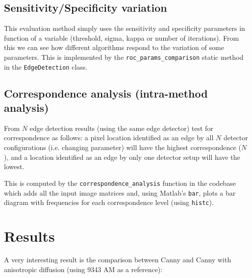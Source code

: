 \documentclass{article}
\begin{document}
	\subsection*{Sensitivity/Specificity variation}	
	
	This evaluation method simply uses the sensitivity and specificity parameters in function
	of a variable (threshold, sigma, kappa or number of iterations). From this we
	can see how different algorithms respond to the variation of some parameters.
	This is implemented by the \verb|roc_params_comparison| static method in the
	\verb|EdgeDetection| class.
	
	\subsection*{Correspondence analysis (intra-method analysis)}	
	
	From $N$ edge detection results (using the same edge detector) test for
	correspondence as follows: a pixel location identified as an edge by
	all $N$ detector configurations (i.e. changing parameter)
	will have the highest correspondence ($N$), and a
	location identified as an edge by only one detector setup will have the lowest.
	
	This is computed by the \verb|correspondence_analysis| function in the codebase which
	adds all the input image matrices and, using Matlab's \verb|bar|, plots a bar diagram
	with frequencies for each correspondence level (using \verb|histc|).
	
	\section{Results}
	
	A very interesting result is the comparison between Canny and Canny with anisotropic diffusion (using 9343 AM as a reference):	
\end{document}
